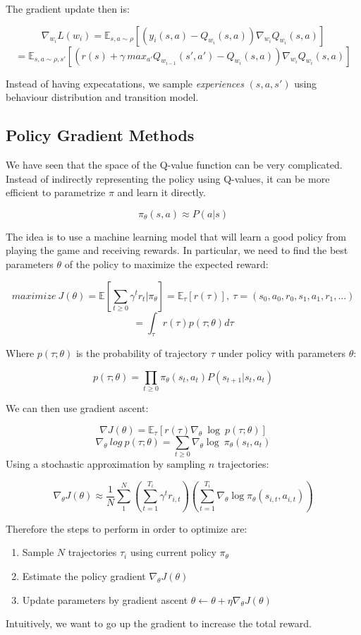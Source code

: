 \documentclass[11pt]{article}
\begin{document}
The gradient update then is:

\[\nabla_{w_i}L(w_i)=\mathbb{E}_{s, a\sim \rho }[(y_i(s, a)-Q_{w_i}(s, a))\nabla_{w_i}Q_{w_i}(s, a)]\]
\[= \mathbb{E}_{s, a\sim \rho, s'}[(r(s)+\gamma\ max_{a'}Q_{w_{i-1}}(s', a')-Q_{w_i}(s,a))\nabla_{w_i}Q_{w_i}(s, a)]\]

Instead of having expecatations, we sample \emph{experiences}
\((s, a, s')\) using behaviour distribution and transition model.

\subsection{Policy Gradient Methods}\label{policy-gradient-methods}

We have seen that the space of the Q-value function can be very
complicated. Instead of indirectly representing the policy using
Q-values, it can be more efficient to parametrize \(\pi\) and learn it
directly.

\[\pi_{\theta}(s, a)\approx P(a|s)\]

The idea is to use a machine learning model that will learn a good
policy from playing the game and receiving rewards. In particular, we
need to find the best parameters \(\theta\) of the policy to maximize
the expected reward:

\[maximize\ J(\theta)=\mathbb{E}[\sum_{t\ge 0}\gamma^tr_t|\pi_{\theta}]=\mathbb{E}_\tau[r(\tau)],\ \tau=(s_0, a_0, r_0, s_1, a_1, r_1, ...)\]
\[=\int_{\tau}r(\tau)p(\tau; \theta)d\tau\]

Where \(p(\tau; \theta)\) is the probability of trajectory \(\tau\)
under policy with parameters \(\theta\):

\[p(\tau; \theta)=\prod_{t\ge 0}\pi_{\theta}(s_t, a_t)P(s_{t+1}|s_t, a_t)\]

We can then use gradient ascent:

\[\nabla J(\theta)=\mathbb{E}_{\tau}[r(\tau)\nabla_{\theta}\ \log\ p(\tau; \theta)]\]
\[\nabla_\theta\ log\ p(\tau; \theta)=\sum_{t\ge0}\nabla_{\theta}\log\ \pi_{\theta}(s_t, a_t)\]
Using a stochastic approximation by sampling \(n\) trajectories:

\[\nabla_{\theta}J(\theta)\approx\frac{1}{N}\sum_{1}^{N}(\sum_{t=1}^{T_i}\gamma^tr_{i, t})(\sum_{t=1}^{T_i}\nabla_{\theta} \log \pi_{\theta}(s_{i, t}, a_{i, t}))\]

Therefore the steps to perform in order to optimize are:

\begin{enumerate}
\def\labelenumi{\arabic{enumi}.}
\tightlist
\item
  Sample \(N\) trajectories \(\tau_i\) using current policy
  \(\pi_{\theta}\)
\item
  Estimate the policy gradient \(\nabla_{\theta}J(\theta)\)
\item
  Update parameters by gradient ascent
  \(\theta \leftarrow \theta + \eta \nabla_{\theta}J(\theta)\)
\end{enumerate}

Intuitively, we want to go up the gradient to increase the total reward.
\end{document}
